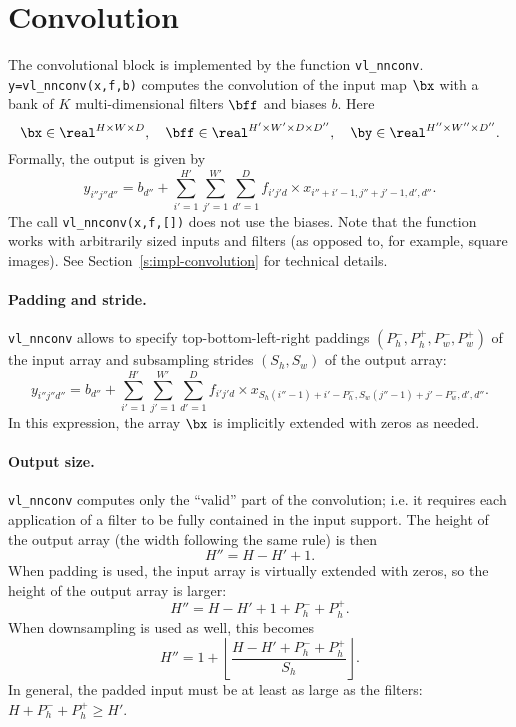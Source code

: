 \section{Convolution}\label{s:convolution}

The convolutional block is implemented by the function \verb!vl_nnconv!. \verb!y=vl_nnconv(x,f,b)! computes the convolution of the input map $\bx$ with a bank of $K$ multi-dimensional filters $\bff$ and biases $b$. Here
\[
 \bx\in\real^{H \times W \times D}, \quad
 \bff\in\real^{H' \times W' \times D \times D''}, \quad
 \by\in\real^{H'' \times W'' \times D''}.
\]
Formally, the output  is given by
\[
y_{i''j''d''}
=
b_{d''}
+
\sum_{i'=1}^{H'}
\sum_{j'=1}^{W'}
\sum_{d'=1}^D
f_{i'j'd} \times x_{i''+i'-1,j''+j'-1,d',d''}.
\]
The call \verb!vl_nnconv(x,f,[])! does not use the biases. Note that the function works with arbitrarily sized inputs and filters (as opposed to, for example, square images). See Section~\ref{s:impl-convolution} for technical details.

\paragraph{Padding and stride.} \verb!vl_nnconv! allows to specify  top-bottom-left-right paddings $(P_h^-,P_h^+,P_w^-,P_w^+)$ of the input array and subsampling strides $(S_h,S_w)$ of the output array:
\[
y_{i''j''d''}
=
b_{d''}
+
\sum_{i'=1}^{H'}
\sum_{j'=1}^{W'}
\sum_{d'=1}^D
f_{i'j'd} \times x_{S_h (i''-1)+i'-P_h^-, S_w(j''-1)+j' - P_w^-,d',d''}.
\]
In this expression, the array $\bx$ is implicitly extended with zeros as needed.

\paragraph{Output size.} \verb!vl_nnconv! computes only the ``valid'' part of the convolution; i.e. it requires each application of a filter to be fully contained in the input support. The height of the output array (the width following the same rule) is then
\[
  H'' = H - H' + 1.
\]
When padding is used, the input array is virtually extended with zeros, so the height of the output array is larger:
\[
  H'' = H - H' + 1 + P_h^- + P_h^+.
\]
When downsampling is used as well, this becomes
\[
  H'' = 1 + \left\lfloor \frac{H - H' + P_h^- + P_h^+}{S_h} \right\rfloor.
\]
In general, the padded input must be at least as large as the filters: $H +P_h^- + P_h^+ \geq H'$.

